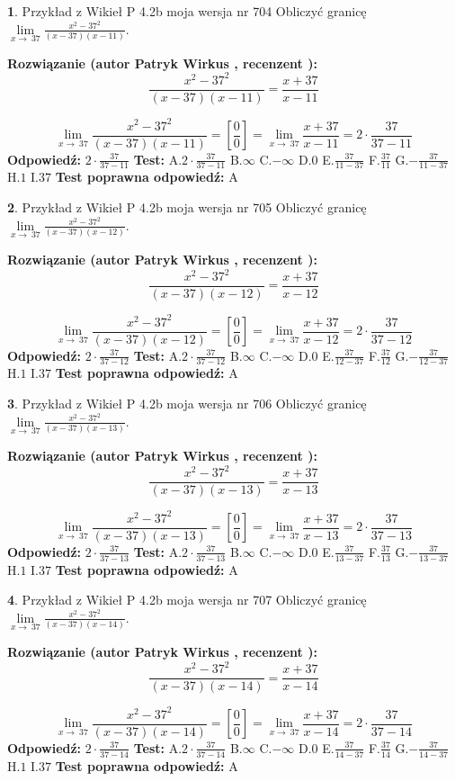\documentclass[12pt, a4paper]{article}
\theoremstyle{definition} %
\newtheorem{zad}{}
\newcommand{\zadStart}[1]{\begin{zad}#1\newline}
\newcommand{\zadStop}{\end{zad}}
\newcommand{\rozwStart}[2]{\noindent \textbf{Rozwiązanie (autor #1 , recenzent #2): }\newline}
\newcommand{\rozwStop}{\newline}
\newcommand{\odpStart}{\noindent \textbf{Odpowiedź:}\newline}
\newcommand{\odpStop}{\newline}
\newcommand{\testStart}{\noindent \textbf{Test:}\newline}
\newcommand{\testStop}{\newline}
\newcommand{\kluczStart}{\noindent \textbf{Test poprawna odpowiedź:}\newline}
\newcommand{\kluczStop}{\newline}
\begin{document}
\zadStart{Przykład z Wikieł P 4.2b moja wersja nr 704}
Obliczyć granicę $\lim\limits_{x\to\ 37}\frac{x^{2}-37^{2}}{(x-37)(x-11)}$.
\zadStop
\rozwStart{Patryk Wirkus}{}
$$\frac{x^{2}-37^{2}}{(x-37)(x-11)}=\frac{x+37}{x-11}$$

$$\lim\limits_{x\to\ 37}\frac{x^{2}-37^{2}}{(x-37)(x-11)}=[\frac{0}{0}]=\lim\limits_{x\to\ 37}\frac{x+37}{x-11}=2 \cdot \frac{37}{37-11}$$
\rozwStop
\odpStart
$2 \cdot \frac{37}{37-11}$
\odpStop
\testStart
A.$2 \cdot \frac{37}{37-11}$
B.$\infty$
C.$-\infty$
D.$0$
E.$\frac{37}{11-37}$
F.$\frac{37}{11}$
G.$-\frac{37}{11-37}$
H.$1$
I.$37$
\testStop
\kluczStart
A
\kluczStop



\zadStart{Przykład z Wikieł P 4.2b moja wersja nr 705}
Obliczyć granicę $\lim\limits_{x\to\ 37}\frac{x^{2}-37^{2}}{(x-37)(x-12)}$.
\zadStop
\rozwStart{Patryk Wirkus}{}
$$\frac{x^{2}-37^{2}}{(x-37)(x-12)}=\frac{x+37}{x-12}$$

$$\lim\limits_{x\to\ 37}\frac{x^{2}-37^{2}}{(x-37)(x-12)}=[\frac{0}{0}]=\lim\limits_{x\to\ 37}\frac{x+37}{x-12}=2 \cdot \frac{37}{37-12}$$
\rozwStop
\odpStart
$2 \cdot \frac{37}{37-12}$
\odpStop
\testStart
A.$2 \cdot \frac{37}{37-12}$
B.$\infty$
C.$-\infty$
D.$0$
E.$\frac{37}{12-37}$
F.$\frac{37}{12}$
G.$-\frac{37}{12-37}$
H.$1$
I.$37$
\testStop
\kluczStart
A
\kluczStop



\zadStart{Przykład z Wikieł P 4.2b moja wersja nr 706}
Obliczyć granicę $\lim\limits_{x\to\ 37}\frac{x^{2}-37^{2}}{(x-37)(x-13)}$.
\zadStop
\rozwStart{Patryk Wirkus}{}
$$\frac{x^{2}-37^{2}}{(x-37)(x-13)}=\frac{x+37}{x-13}$$

$$\lim\limits_{x\to\ 37}\frac{x^{2}-37^{2}}{(x-37)(x-13)}=[\frac{0}{0}]=\lim\limits_{x\to\ 37}\frac{x+37}{x-13}=2 \cdot \frac{37}{37-13}$$
\rozwStop
\odpStart
$2 \cdot \frac{37}{37-13}$
\odpStop
\testStart
A.$2 \cdot \frac{37}{37-13}$
B.$\infty$
C.$-\infty$
D.$0$
E.$\frac{37}{13-37}$
F.$\frac{37}{13}$
G.$-\frac{37}{13-37}$
H.$1$
I.$37$
\testStop
\kluczStart
A
\kluczStop



\zadStart{Przykład z Wikieł P 4.2b moja wersja nr 707}
Obliczyć granicę $\lim\limits_{x\to\ 37}\frac{x^{2}-37^{2}}{(x-37)(x-14)}$.
\zadStop
\rozwStart{Patryk Wirkus}{}
$$\frac{x^{2}-37^{2}}{(x-37)(x-14)}=\frac{x+37}{x-14}$$

$$\lim\limits_{x\to\ 37}\frac{x^{2}-37^{2}}{(x-37)(x-14)}=[\frac{0}{0}]=\lim\limits_{x\to\ 37}\frac{x+37}{x-14}=2 \cdot \frac{37}{37-14}$$
\rozwStop
\odpStart
$2 \cdot \frac{37}{37-14}$
\odpStop
\testStart
A.$2 \cdot \frac{37}{37-14}$
B.$\infty$
C.$-\infty$
D.$0$
E.$\frac{37}{14-37}$
F.$\frac{37}{14}$
G.$-\frac{37}{14-37}$
H.$1$
I.$37$
\testStop
\kluczStart
A
\kluczStop
\end{document}
